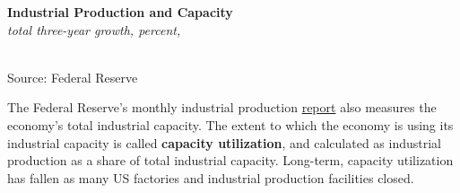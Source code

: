 \documentclass{report}
\newcommand{\tbllink}[1]{\href{https://raw.githubusercontent.com/bdecon/US-chartbook/master/chartbook/data/#1}{\faTable}}
\newcommand{\barylab}[2]{yticklabel style={text width=#1, align=right, 
		style={black!70}, text height=#2},}
\newcommand{\bbar}[2]{extra #1 ticks = {{#2}}, extra #1 tick labels = ,
		extra #1 tick style = {grid=major, grid style={thick, black!25}},}
\newcommand{\barplotnogrid}{xbar=0pt, axis line style={draw=none},
	    yticklabel style={align=left, anchor=east},
      		xmajorticks=false, ymajorgrids=false,   
	    ytick=data, tickwidth=0pt, area legend, reverse legend,
	    nodes near coords, nodes near coords align={horizontal},}
\begin{document}
{{{{\begin{minipage}{0.76\textwidth}
\end{minipage}
\newpage
\begin{minipage}{0.31\textwidth}
\small 

\end{minipage} \hspace{5mm}
\begin{minipage}{0.4\textwidth}
\noindent \normalsize \textbf{Industrial Production and Capacity}\\
\footnotesize{\textit{total three-year growth, percent, }}\\ 
\noindent \hspace*{-5mm} \\
\footnotesize{Source: Federal Reserve} \hfill \tbllink{ip_comp.csv}\\
\end{minipage}

\vspace{2mm}

\begin{minipage}{0.76\textwidth}
\small The Federal Reserve's monthly industrial production \href{https://www.federalreserve.gov/releases/g17/}{report} also measures the economy's total industrial capacity. The extent to which the economy is using its industrial capacity is called \textbf{capacity utilization}, and calculated as industrial production as a share of total industrial capacity. Long-term, capacity utilization has fallen as many US factories and industrial production facilities closed. 


\end{minipage}}}}}
\end{document}

